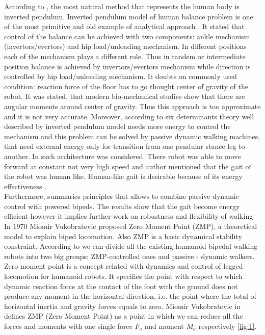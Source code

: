 \documentclass[12pt,a4paper]{report}
\begin{document}
		According to \cite{tang2008analysis}, the most natural method that represents the human body is inverted pendulum.
		Inverted pendulum model of human balance problem is one of the most primitive and old example of analytical approach \cite{winter1995human}. It stated that control of the balance can be achieved with two components: ankle mechanism (invertors/evertors) and hip load/unloading mechanism. In different positions each of the mechanism plays a different role. Thus in tandem or intermediate position balance is achieved by invertors/evertors mechanism while direction is controlled by hip load/unloading mechanism. It doubts on commonly used condition: reaction force of the floor has to go thought center of gravity of the robot. It was stated, that modern bio-mechanical studies show that there are angular moments around center of gravity. 
		Thus this approach is too approximate and it is not very accurate.
		Moreover, according to \cite{kuo2007six} six determinants theory\cite{inman1953major} well described by inverted pendulum model needs more energy to control the mechanism and this problem can be solved by passive dynamic walking machines, that need external energy only for transition from one pendular stance leg to another. In \cite{collins2005bipedal} such architecture was considered. There robot was able to move forward at constant not very high speed and author mentioned that the gait of the robot was human like. Human-like gait is desirable because of its energy effectiveness \cite{golliday1977approach}.\\
		Furthermore, \cite{anderson2005powered} summaries principles that allows to combine passive dynamic control with powered bipeds. The results show that the gait become energy efficient however it implies further work on robustness and flexibility of walking\\

		In 1970 Miomir Vukobratovic proposed Zero Moment Point (ZMP), a theoretical model to explain biped locomotion. Also ZMP is a basic dynamical stability constraint.
		According to \cite{manchester2011stable} we can divide all the existing humanoid bipedal walking robots into two big groups: ZMP-controlled ones and passive - dynamic walkers.\\
		Zero moment point is a concept related with dynamics and control of legged locomotion for humanoid robots. It specifies the point with respect to which dynamic reaction force at the contact of the foot with the ground does not produce any moment in the horizontal direction, i.e. the point where the total of horizontal inertia and gravity forces equals to zero.
		Miomir Vukobratovic in \cite{vukobratovic2004zero} defines ZMP (Zero Moment Point) as a point in which we can reduce all the forces and moments with one single force $F_a$ and moment $M_a$ respectively  \cref{fig:1}.
	
\end{document}

